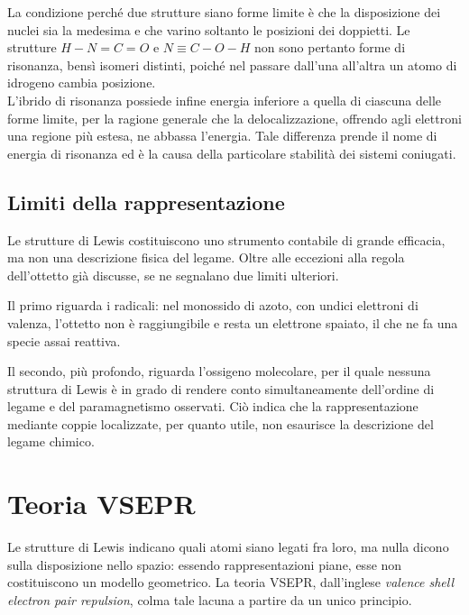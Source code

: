 La condizione perché due strutture siano forme limite è che la disposizione dei nuclei sia la medesima e che varino soltanto le posizioni dei doppietti. Le strutture $H - N = C = O$ e $N \equiv C - O - H$ non sono pertanto forme di risonanza, bensì isomeri distinti, poiché nel passare dall'una all'altra un atomo di idrogeno cambia posizione.\\

L'ibrido di risonanza possiede infine energia inferiore a quella di ciascuna delle forme limite, per la ragione generale che la delocalizzazione, offrendo agli elettroni una regione più estesa, ne abbassa l'energia. Tale differenza prende il nome di energia di risonanza ed è la causa della particolare stabilità dei sistemi coniugati.

\subsection{Limiti della rappresentazione}

Le strutture di Lewis costituiscono uno strumento contabile di grande efficacia, ma non una descrizione fisica del legame. Oltre alle eccezioni alla regola dell'ottetto già discusse, se ne segnalano due limiti ulteriori.

Il primo riguarda i radicali: nel monossido di azoto, con undici elettroni di valenza, l'ottetto non è raggiungibile e resta un elettrone spaiato, il che ne fa una specie assai reattiva.

Il secondo, più profondo, riguarda l'ossigeno molecolare, per il quale nessuna struttura di Lewis è in grado di rendere conto simultaneamente dell'ordine di legame e del paramagnetismo osservati. Ciò indica che la rappresentazione mediante coppie localizzate, per quanto utile, non esaurisce la descrizione del legame chimico.

\newpage

\section{Teoria VSEPR}

Le strutture di Lewis indicano quali atomi siano legati fra loro, ma nulla dicono sulla disposizione nello spazio: essendo rappresentazioni piane, esse non costituiscono un modello geometrico. La teoria VSEPR, dall'inglese \emph{valence shell electron pair repulsion}, colma tale lacuna a partire da un unico principio.\\

